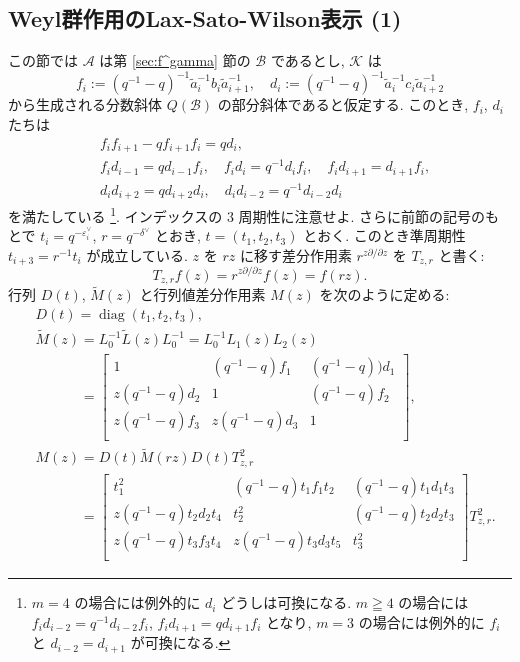 \documentclass[12pt,twoside,dvipdfm]{msjproc}
\theoremstyle{definition} %
\theoremstyle{definition} %
\theoremstyle{definition} %
\numberwithin{theorem}{section}
\numberwithin{equation}{section}
\numberwithin{figure}{section}
\numberwithin{table}{section}
\newcommand\secref[1]{第 \ref{#1} 節}
\newcommand\A{\mathcal{A}}
\newcommand\K{\mathcal{K}}
\newcommand\B{\mathcal{B}}
\newcommand\diag{\mathop{\mathrm{diag}}\nolimits}
\newcommand\tL{{\widetilde{L}}}
\newcommand\tM{{\widetilde{M}}}
\newcommand\ta{{\tilde{a}}}
\newcommand\ev{\varepsilon^\vee}
\newcommand\dv{\delta^\vee}
\begin{document}
\subsection{Weyl群作用のLax-Sato-Wilson表示 (1)}
\label{sec:Sato-Wilson-1}

この節では $\A$ は\secref{sec:f^gamma}の $\B$ であるとし, 
$\K$ は
\begin{equation*}
  f_i:=(q^{-1}-q)^{-1}\ta_i^{-1}b_i\ta_{i+1}^{-1}, \quad
  d_i:=(q^{-1}-q)^{-1}\ta_i^{-1}c_i\ta_{i+2}^{-1}
\end{equation*}
から生成される分数斜体 $Q(\B)$ の部分斜体であると仮定する.
このとき, $f_i$, $d_i$ たちは
\begin{align*}
 &
 f_i f_{i+1} - q f_{i+1}f_i = q d_i,
 \\ &
 f_id_{i-1}=q d_{i-1}f_i, \quad
 f_id_i=q^{-1} d_i f_i, \quad
 f_id_{i+1}=d_{i+1}f_i,
 \\ &
 d_i d_{i+2} = q d_{i+2} d_i, \quad
 d_i d_{i-2} = q^{-1} d_{i-2} d_i
\end{align*}
を満たしている%
\footnote{$m=4$ の場合には例外的に $d_i$ どうしは可換になる.
$m\geqq4$ の場合には $f_id_{i-2}=q^{-1}d_{i-2}f_i$, $f_id_{i+1}=qd_{i+1}f_i$ となり, 
$m=3$ の場合には例外的に $f_i$ と $d_{i-2}=d_{i+1}$ が可換になる.}. %
インデックスの $3$ 周期性に注意せよ.
さらに前節の記号のもとで $t_i = q^{-\ev_i}$, $r=q^{-\dv}$ とおき, 
$t=(t_1,t_2,t_3)$ とおく. このとき準周期性 $t_{i+3}=r^{-1}t_i$
が成立している. 
$z$ を $rz$ に移す差分作用素 $r^{z\partial/\partial z}$ を $T_{z,r}$ と書く:
\begin{equation*}
  T_{z,r}f(z) = r^{z\partial/\partial z}f(z) = f(rz).
\end{equation*}
行列 $D(t)$, $\tM(z)$ と行列値差分作用素 $M(z)$ を次のように定める: 
\begin{align*}
  &
  D(t) = \diag(t_1,t_2,t_3), 
  \\ &
  \tM(z) = L_0^{-1}\tL(z)L_0^{-1} = L_0^{-1}L_1(z)L_2(z)
  \\ &
  \phantom{\tM(z)}=
  \begin{bmatrix}
    1               & (q^{-1}-q) f_1 & (q^{-1}-q))d_1 \\
    z (q^{-1}-q)d_2 & 1              & (q^{-1}-q)f_2  \\
    z (q^{-1}-q)f_3 & z(q^{-1}-q)d_3 & 1              \\
  \end{bmatrix},
  \\ &
  M(z)
  = D(t)\tM(rz)D(t)T_{z,r}^2
  \\ &
  \phantom{M(z)}=
  \begin{bmatrix}
    t_1^2     &   (q^{-1}-q)t_1f_1t_2 & (q^{-1}-q)t_1d_1t_3 \\
    z (q^{-1}-q)t_2d_2t_4 &   t_2^2     & (q^{-1}-q)t_2d_2t_3 \\
    z (q^{-1}-q)t_3f_3t_4 & z (q^{-1}-q)t_3d_3t_5 & t_3^2 \\
  \end{bmatrix}
  T_{z,r}^2.
\end{align*}
\end{document}
